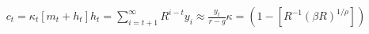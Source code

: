 \begin{align}
	c_t = \kappa_t[m_t + h_t]
	h_t = \sum_{i=t+1}^{\infty}R^{i-t}y_{i} \approx \frac{y_t}{r - g}
	\kappa = {(1 - {[R^{-1}(\beta R)^{1/\rho}]})}
\end{align}
